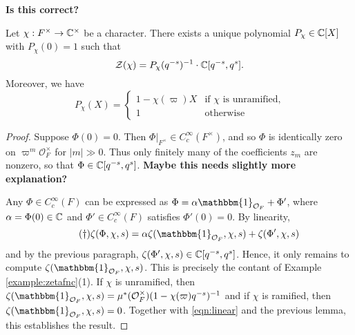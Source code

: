 \textbf{Is this correct?}
\fi

\begin{prop}\label{prop:gl1factor}
    Let $\chi:F^\times \to \mathbb{C}^\times$ be a character. There exists a unique polynomial $P_\chi \in \mathbb{C}[X]$ with $P_\chi(0)=1$ such that
    $$\mathcal Z(\chi) = P_\chi(q^{-s})^{-1}\cdot \mathbb{C}[q^{-s},q^s].$$
    Moreover, we have
    $$
    P_\chi(X) =
    \begin{cases}
        1-\chi(\varpi)X & \text{if $\chi$ is unramified,} \\
        1 & \text{otherwise}
    \end{cases}
    $$
\end{prop}
\begin{proof}
    Suppose $\Phi(0)=0$. Then $\Phi|_{F^\times} \in C_c^\infty(F^\times)$, and so $\Phi$ is identically zero on $\varpi^m\mathcal O_F^\times$ for $|m| \gg0$. Thus only finitely many of the coefficients $z_m$ are nonzero, so that $\Phi \in \mathbb{C}[q^{-s},q^s]$. \textbf{Maybe this needs slightly more explanation?}

    Any $\Phi\in C_c^\infty(F)$ can be expressed as $\Phi=\alpha\mathbbm{1}_{\mathcal{O}_F}+\Phi'$, where $\alpha=\Phi(0)\in\mathbb{C}$ and $\Phi'\in C_c^\infty(F)$ satisfies $\Phi'(0)=0$. By linearity,
    \begin{equation}\tag{\dag}\label{eqn:linear}
        \zeta(\Phi,\chi,s)=\alpha\zeta(\mathbbm{1}_{\mathcal{O}_F},\chi,s)+\zeta(\Phi',\chi,s)
    \end{equation}
    and by the previous paragraph, $\zeta(\Phi',\chi,s)\in\mathbb{C}[q^{-s},q^{s}]$. Hence, it only remains to compute $\zeta(\mathbbm{1}_{\mathcal O_F},\chi,s)$. This is precisely the contant of Example \ref{example:zetafnc}(1). If $\chi$ is unramified, then $\zeta(\mathbbm{1}_{\mathcal O_F},\chi,s)=\mu^*(\mathcal{O}_F^\times)(1-\chi(\varpi)q^{-s})^{-1}$ and if $\chi$ is ramified, then $\zeta(\mathbbm{1}_{\mathcal O_F},\chi,s)=0$. Together with \eqref{eqn:linear} and the previous lemma, this establishes the result. 
\end{proof}

\iffalse
\begin{rem}
    The computation in the proof above shows, in the case $\chi = 1$, that $\zeta(\mathbbm{1}_{\cO_F},1,s) = (1-q^{-s})^{-1}$, provided that $\mu^*(\mathcal{O}_F^\times)=1$. If $F=K_v$ is the completion of a number field $K$ at a non-Archimedean place $v$, we recover the Euler factor of the Dedekind zeta function $\zeta_K(s)$ at the place $v$. This explains the naming of our zeta functions. 
\end{rem}
\fi

